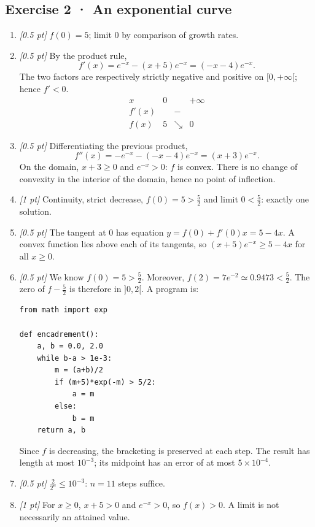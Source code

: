 \subsection*{Exercise 2 · An exponential curve}\begin{enumerate}

\item \textit{[0.5 pt]} $f(0)=5$; limit $0$ by comparison of growth rates.

\item \textit{[0.5 pt]} By the product rule,
\[f'(x)=e^{-x}-(x+5)e^{-x}=(-x-4)e^{-x}.\]
The two factors are respectively strictly negative and positive on $[0,+\infty[$; hence $f'<0$.
\[\begin{array}{c|ccc}x&0&&+\infty\\\hline f'(x)&&-&\\\hline f(x)&5&\searrow&0\end{array}\]

\item \textit{[0.5 pt]} Differentiating the previous product,
\[f''(x)=-e^{-x}-(-x-4)e^{-x}=(x+3)e^{-x}.\]
On the domain, $x+3\ge0$ and $e^{-x}>0$: $f$ is convex. There is no change of convexity in the interior of the domain, hence no point of inflection.

\item \textit{[1 pt]} Continuity, strict decrease, $f(0)=5>\frac{5}{2}$ and limit $0<\frac{5}{2}$: exactly one solution.

\item \textit{[0.5 pt]} The tangent at $0$ has equation $y=f(0)+f'(0)x=5-4x$. A convex function lies above each of its tangents, so $(x+5)e^{-x}\ge 5-4x$ for all $x\ge0$.


\item \textit{[0.5 pt]} We know $f(0)=5>\frac{5}{2}$. Moreover, $f(2)=7e^{-2}\simeq0.9473<\frac{5}{2}$. The zero of $f-\frac{5}{2}$ is therefore in $]0,2[$. A program is:
\begin{lstlisting}
from math import exp

def encadrement():
    a, b = 0.0, 2.0
    while b-a > 1e-3:
        m = (a+b)/2
        if (m+5)*exp(-m) > 5/2:
            a = m
        else:
            b = m
    return a, b
\end{lstlisting}
Since $f$ is decreasing, the bracketing is preserved at each step. The result has length at most $10^{-3}$; its midpoint has an error of at most $5\times10^{-4}$.

\item \textit{[0.5 pt]} $\frac{2}{2^n}\le10^{-3}$: $n=11$ steps suffice.

\item \textit{[1 pt]} For $x\ge0$, $x+5>0$ and $e^{-x}>0$, so $f(x)>0$. A limit is not necessarily an attained value.

\end{enumerate}

